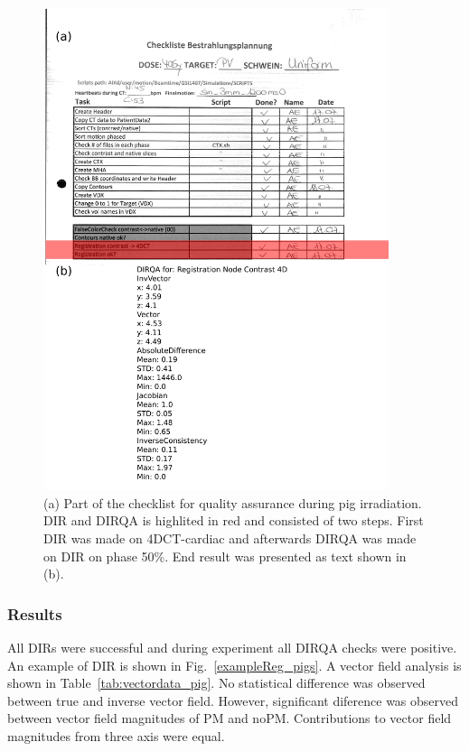 \documentclass[type=dr, dr=rernat, accentcolor=tud7b,colorbacktitle, bigchapter, openright, twoside, 12pt ]{tudthesis}
\begin{document}
\newpage
\begin{figure}[H]
	\begin{center}		
		\includegraphics[width=0.9\textwidth]{./Images/checkList.png}
		\caption{(a) Part of the checklist for quality assurance during pig irradiation. DIR and DIRQA is highlited in red and consisted of two steps. First DIR was made on 4DCT-cardiac and afterwards DIRQA was made on
		DIR on phase 50\%. End result was presented as text shown in (b).}
		\label{checkList}
	\end{center}
\end{figure}
\newpage

\subsubsection{Results}


All DIRs were successful and during experiment all DIRQA checks were positive. An example of DIR is shown in Fig.~\ref{exampleReg_pigs}. A vector field analysis is shown in Table~\ref{tab:vectordata_pig}. No statistical difference was
observed between true and inverse vector field. However, significant diference was observed between vector field magnitudes of PM and noPM. Contributions to vector field magnitudes from three axis were equal. 
\end{document}
